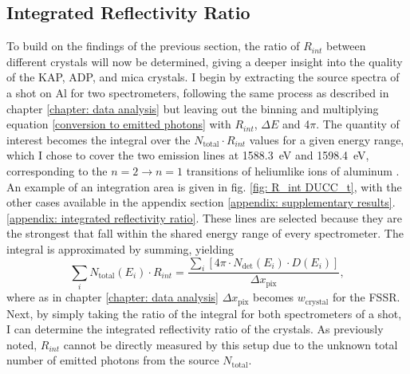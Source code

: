 \subsection{Integrated Reflectivity Ratio}
\label{section: int refl ratio}

To build on the findings of the previous section, the ratio of $R_{int}$ between different crystals will now be determined, giving a deeper insight into the quality of the KAP, ADP, and mica crystals. I begin by extracting the source spectra of a shot on Al for two spectrometers, following the same process as described in chapter \ref{chapter: data analysis} but leaving out the binning and multiplying equation \ref{conversion to emitted photons} with $R_{int}$, $\Delta E$ and 4$\pi$. The quantity of interest becomes the integral over the $N_{\text{total}}\cdot R_{int}$ values for a given energy range, which I chose to cover the two emission lines at \SI{1588.3}{\electronvolt} and \SI{1598.4}{\electronvolt}, corresponding to the $n=2\rightarrow n=1$ transitions of heliumlike ions of aluminum \citep{thompson2001x}. An example of an integration area is given in fig. \ref{fig: R_int DUCC_t}, with the other cases available in the appendix section \ref{appendix: supplementary results}.\ref{appendix: integrated reflectivity ratio}. These lines are selected because they are the strongest that fall within the shared energy range of every spectrometer. The integral is approximated by summing, yielding
\begin{equation}
	\sum_{i}N_{\text{total}}(E_i)\cdot R_{int} = \frac{\sum_{i}[4\pi\cdot N_{\text{det}}(E_i)\cdot D(E_i)]}{\Delta x_{\text{pix}}},
	\label{eq: ratio of R_int}
\end{equation}
where as in chapter \ref{chapter: data analysis} $\Delta x_{\text{pix}}$ becomes $w_{\text{crystal}}$ for the FSSR. Next, by simply taking the ratio of the integral for both spectrometers of a shot, I can determine the integrated reflectivity ratio of the crystals. As previously noted, $R_{int}$ cannot be directly measured by this setup due to the unknown total number of emitted photons from the source $N_{\text{total}}$.


